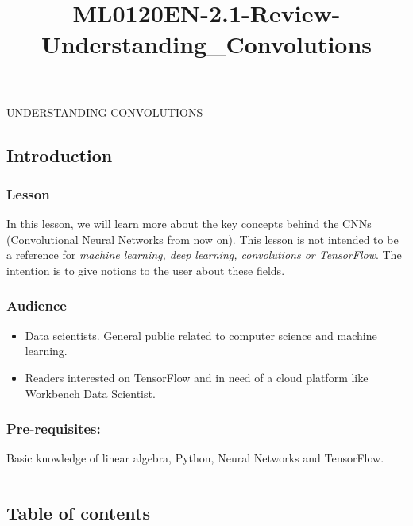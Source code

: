 \documentclass[11pt]{article}
\title{ML0120EN-2.1-Review-Understanding\_Convolutions}
\begin{document}
    
    
    \maketitle
    
    

    
     UNDERSTANDING CONVOLUTIONS

    \subsection{Introduction}\label{introduction}

    \subsubsection{Lesson}\label{lesson}

In this lesson, we will learn more about the key concepts behind the
CNNs (Convolutional Neural Networks from now on). This lesson is not
intended to be a reference for \emph{machine learning, deep learning,
convolutions or TensorFlow}. The intention is to give notions to the
user about these fields.

\subsubsection{Audience}\label{audience}

\begin{itemize}
\item
  Data scientists. General public related to computer science and
  machine learning.
\item
  Readers interested on TensorFlow and in need of a cloud platform like
  Workbench Data Scientist.
\end{itemize}

\subsubsection{Pre-requisites:}\label{pre-requisites}

Basic knowledge of linear algebra, Python, Neural Networks and
TensorFlow.

    \begin{center}\rule{0.5\linewidth}{\linethickness}\end{center}

    \subsection{Table of contents}\label{table-of-contents}
\end{document}

